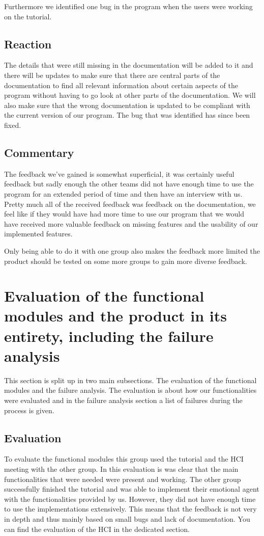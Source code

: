 \documentclass[11pt]{article}
\begin{document}
Furthermore we identified one bug in the program when the users were working on the tutorial. 
\subsection{Reaction}
The details that were still missing in the documentation will be added to it and there will be updates to make sure that there are central parts of the documentation to find all relevant information about certain aspects of the program without having to go look at other parts of the documentation. We will also make sure that the wrong documentation is updated to be compliant with the current version of our program. The bug that was identified has since been fixed.

\subsection{Commentary}
The feedback we've gained is somewhat superficial, it was certainly useful feedback but sadly enough the other teams did not have enough time to use the program for an extended period of time and then have an interview with us. Pretty much all of the received feedback was feedback on the documentation, we feel like if they would have had more time to use our program that we would have received more valuable feedback on missing features and the usability of our implemented features.

Only being able to do it with one group also makes the feedback more limited the product should be tested on some more groups to gain more diverse feedback.

\section{Evaluation of the functional modules and the product in its entirety, including the
	failure analysis}
This section is split up in two main subsections. The evaluation of the functional modules and the failure analysis. The evaluation is about how our functionalities were evaluated and in the failure analysis section a list of failures during the process is given.

\subsection{Evaluation}
To evaluate the functional modules this group used the tutorial and the HCI meeting with the other group. In this evaluation is was clear that the main functionalities that were needed were present and working. The other group successfully finished the tutorial and was able to implement their emotional agent with the functionalities provided by us. However, they did not have enough time to use the implementations extensively. This means that the feedback is not very in depth and thus mainly based on small bugs and lack of documentation. You can find the evaluation of the HCI in the dedicated section.
\end{document}
